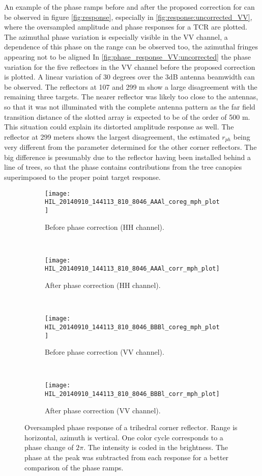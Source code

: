 An example of the phase ramps before and after the proposed correction for can be observed in figure \autoref{fig:response}, especially in \autoref{fig:response:uncorrected_VV}, where the oversampled amplitude and phase responses for a TCR are plotted. The azimuthal phase variation is especially visible in the VV channel, a dependence of this phase on the range can be observed too, the azimuthal fringes appearing not to be  aligned 
In \autoref{fig:phase_response_VV:uncorrected} the phase variation for the five reflectors in the VV channel before the proposed correction is plotted. A linear variation of 30 degrees over the 3dB antenna beamwidth can be observed. The reflectors at 107 and 299 m show a large disagreement with the remaining three targets. The nearer reflector was likely too close to the antennas, so that it was not illuminated with the complete antenna pattern as the far field transition distance of the slotted array is expected to be of the order of 500 m. This situation could explain its distorted amplitude response as well. The reflector at 299 meters shows the largest disagreement, the estimated $r_{ph}$ being very different from the parameter determined for the other corner reflectors. The big difference is presumably due to the reflector having been installed behind a line of trees, so that the phase contains contributions from the tree canopies superimposed to the proper point target response.\\
\begin{figure}[H]
	\centering
	\begin{subfigure}[b]{0.5\columnwidth}
			\centering
			\texttt{[image: HIL\_20140910\_144113\_810\_8046\_AAAl\_coreg\_mph\_plot]}
			\caption{Before phase correction (HH channel).}
			\label{fig:response:uncorrected_HH}
	\end{subfigure}~
	\begin{subfigure}[b]{0.5\columnwidth}
			\centering
			\texttt{[image: HIL\_20140910\_144113\_810\_8046\_AAAl\_corr\_mph\_plot]}
			\caption{After phase correction (HH channel).}
			\label{fig:response:corrected_HH}
	\end{subfigure}\\
	\begin{subfigure}[b]{0.5\columnwidth}
			\centering
			\texttt{[image: HIL\_20140910\_144113\_810\_8046\_BBBl\_coreg\_mph\_plot]}
			\caption{Before phase correction (VV channel).}
			\label{fig:response:uncorrected_VV}
	\end{subfigure}~
	\begin{subfigure}[b]{0.5\columnwidth}
			\centering
			\texttt{[image: HIL\_20140910\_144113\_810\_8046\_BBBl\_corr\_mph\_plot]}
			\caption{After phase correction (VV channel).}
			\label{fig:response:corrected_VV}
	\end{subfigure}
	\caption{Oversampled phase response of a trihedral corner reflector. Range is horizontal, azimuth is vertical. One color cycle corresponds to a phase change of $2 \pi$. The intensity is coded in the brightness. The phase at the peak was subtracted from each response for a better comparison of the phase ramps.}
\label{fig:response}
\end{figure}
